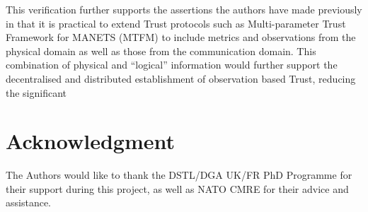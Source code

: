 \documentclass[conference]{IEEEtran}
\begin{document}
This verification further supports the assertions the authors have made previously in \cite{Bolster2014}  that it is practical to extend Trust protocols such as Multi-parameter Trust Framework for MANETS (MTFM)\cite{Guo2012} to include metrics and observations from the physical domain as well as those from the communication domain. 
This combination of physical and ``logical'' information would further support the decentralised and distributed establishment of observation based Trust, reducing the significant 




\section*{Acknowledgment}

The Authors would like to thank the DSTL/DGA UK/FR PhD Programme for their support during this project, as well as NATO CMRE for their advice and assistance.




\end{document}
